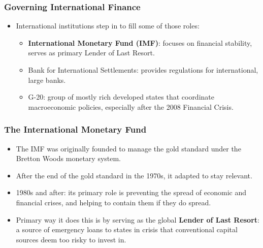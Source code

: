 \documentclass{beamer}
\begin{document}
\begin{frame} 
	\frametitle{\LARGE{Governing International Finance}}
	\begin{itemize}
		\item International institutions step in to fill some of those roles: \pause 
		\begin{itemize}
			\item \textbf{International Monetary Fund (IMF)}: focuses on financial stability, serves as primary Lender of Last Resort. \pause 
			\item Bank for International Settlements: provides regulations for international, large banks. \pause 
			\item G-20: group of mostly rich developed states that coordinate macroeconomic policies, especially after the 2008 Financial Crisis.
		\end{itemize}
	\end{itemize}
\end{frame}

\begin{frame} 
	\frametitle{\LARGE{The International Monetary Fund}}
	\begin{itemize}
		\item The IMF was originally founded to manage the gold standard under the Bretton Woods monetary system.
		\item After the end of the gold standard in the 1970s, it adapted to stay relevant.
  		\item 1980s and after: its primary role is preventing the spread of economic and financial crises, and helping to contain them if they do spread.
  		\item Primary way it does this is by serving as the global \textbf{Lender of Last Resort}: a source of emergency loans to states in crisis that conventional capital sources deem too risky to invest in. 
	\end{itemize}
\end{frame}
\end{document}
